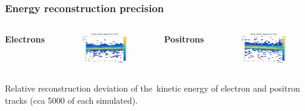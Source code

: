 \documentclass{beamer}
\begin{document}
	\begin{frame}
		\frametitle{Energy reconstruction precision}
		\centering
		\begin{columns}
			\centering
			\Large \textbf{Electrons}
			\begin{figure}
				\centering
				\includegraphics[width = 0.95 \linewidth]{../images/h_e_deltaenergy_theta.png}
			\end{figure}
			\centering
			\Large \textbf{Positrons}
			\begin{figure}
				\centering
				\includegraphics[width = 0.95 \linewidth]{../images/h_p_deltaenergy_theta.png}
			\end{figure}
		\end{columns}
		\vspace{0.5cm}
		\footnotesize{Relative reconstruction deviation of the~kinetic energy of electron and positron tracks (cca 5000 of each simulated).}
	\end{frame}
	
\end{document}
